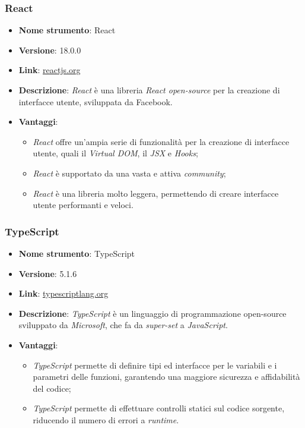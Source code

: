 \subsubsection{React}
\begin{itemize}
      \item \textbf{Nome strumento}: React
      \item \textbf{Versione}: 18.0.0
      \item \textbf{Link}: \href{https://reactjs.org/}{reactjs.org}
      \item \textbf{Descrizione}: \textit{React} è una libreria \textit{React open-source} per la creazione di interfacce utente, sviluppata da Facebook.
      \item \textbf{Vantaggi}:
            \begin{itemize}
                  \item \textit{React} offre un'ampia serie di funzionalità per la creazione di interfacce utente, quali il \textit{Virtual DOM}, il \textit{JSX} e \textit{Hooks};
                  \item \textit{React} è supportato da una vasta e attiva \textit{community};
                  \item \textit{React} è una libreria molto leggera, permettendo di creare interfacce utente performanti e veloci.
            \end{itemize}
\end{itemize}

\subsubsection{TypeScript}
\begin{itemize}
      \item \textbf{Nome strumento}: TypeScript
      \item \textbf{Versione}: 5.1.6
      \item \textbf{Link}: \href{https://www.typescriptlang.org/}{typescriptlang.org}
      \item \textbf{Descrizione}: \textit{TypeScript} è un linguaggio di programmazione open-source sviluppato da \textit{Microsoft}, che fa da \textit{\gls{super-set}\glox} a \textit{JavaScript}.
      \item \textbf{Vantaggi}:
            \begin{itemize}
                  \item \textit{TypeScript} permette di definire tipi ed interfacce per le variabili e i parametri delle funzioni, garantendo una maggiore sicurezza e affidabilità del codice;
                  \item \textit{TypeScript} permette di effettuare controlli statici sul codice sorgente, riducendo il numero di errori a \textit{runtime}.
            \end{itemize}
\end{itemize}

